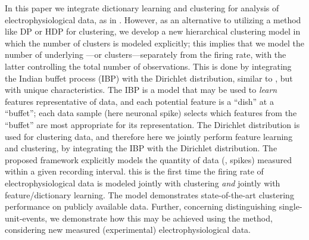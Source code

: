 \documentclass[journal]{IEEEtran}
\begin{document}
% 
In this paper we integrate dictionary learning and clustering for analysis of electrophysiological data, as in \cite{Dilan,Bo2011}. However, as an alternative to utilizing a method like DP or HDP \cite{Wood2009,Bo2011} for clustering, we develop a new hierarchical clustering model in which the number of clusters is modeled explicitly; this implies that we model the number of underlying ---or clusters---separately from the firing rate, with the latter controlling the total number of observations. This is done by integrating the Indian buffet process (IBP) \cite{IBP} with the Dirichlet distribution, similar to \cite{compound}, but with unique characteristics. The IBP is a model that may be used to \emph{learn} features representative of data, and each potential feature is a ``dish'' at a ``buffet''; each data sample (here  neuronal spike) selects which features from the ``buffet'' are most appropriate for its representation. The Dirichlet distribution is used for clustering data, and therefore here we jointly perform feature learning and clustering, by integrating the IBP with the Dirichlet distribution. The proposed framework explicitly models the quantity of data (, spikes) measured within a given recording interval.  this is the first time the firing rate of electrophysiological data is modeled jointly with clustering \emph{and} jointly with feature/dictionary learning. The model demonstrates state-of-the-art clustering performance on publicly available data. Further, concerning distinguishing single-unit-events, we demonstrate how this may be achieved using the   method, considering new measured (experimental) electrophysiological data.
\end{document}
